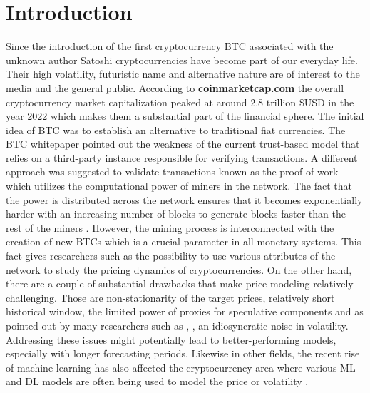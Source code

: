 \chapter{Introduction}
\label{chap:one}

Since the introduction of the first cryptocurrency \ac{BTC}
associated with the unknown author Satoshi \cite{Nakamoto2008} cryptocurrencies
have become part of our everyday life. Their high volatility, futuristic name 
and alternative nature are of interest to the media and the general public.
According to \textbf{\href{https://coinmarketcap.com/charts/}{coinmarketcap.com}}
the overall cryptocurrency market capitalization peaked at around 2.8 trillion \$USD in the year 2022
which makes them a substantial part of the financial sphere.
The initial idea of \ac{BTC} was to establish an alternative to traditional fiat currencies. 
The \ac{BTC} whitepaper
pointed out the weakness of the current trust-based model that relies on a third-party instance responsible
for verifying transactions.
A different approach was suggested to validate transactions known as the proof-of-work which
utilizes the computational power of miners in the network. The fact that the power is 
distributed across the network ensures that it becomes exponentially harder with an increasing number of blocks
to generate blocks faster than the rest of the miners \cite[pg.~6]{Nakamoto2008}. 
However, the mining process is interconnected with the creation of new \ac{BTC}s which is a crucial parameter
in all monetary systems. This fact gives researchers such as \cite{Kukacka2023} 
the possibility to use various attributes of the network to study the pricing dynamics of cryptocurrencies. 
On the other hand, there are a couple of substantial drawbacks that make price modeling relatively challenging.
Those are non-stationarity of the target prices, relatively short historical window, the limited power of
proxies for speculative components and as pointed out by many researchers 
such as \cite{Bouri2022}, \cite{Dimpfl2021}, \cite{Watorek2023} an idiosyncratic noise in volatility.
Addressing these issues might potentially lead to better-performing models, especially
with longer forecasting periods. Likewise in other fields, the recent rise of machine learning 
has also affected the cryptocurrency area where various \ac{ML} and \ac{DL} models 
are often being used 
to model the price \cite{Khedr2021} or volatility \cite{Kristjanpoller2018}. 



